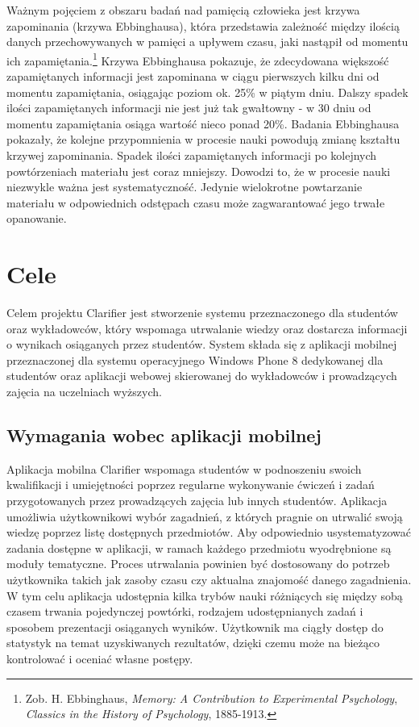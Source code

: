 \documentclass{pracamgr}
\begin{document}
Ważnym pojęciem z obszaru badań nad pamięcią człowieka jest krzywa zapominania (krzywa Ebbinghausa), która przedstawia zależność między ilością danych przechowywanych w pamięci a upływem czasu, jaki nastąpił od momentu ich zapamiętania.\footnote{Zob. H. Ebbinghaus, \textit{Memory: A Contribution to Experimental Psychology}, \textit{Classics in the History of Psychology}, 1885-1913.} Krzywa Ebbinghausa pokazuje, że zdecydowana większość zapamiętanych informacji jest zapominana w ciągu pierwszych kilku dni od momentu zapamiętania, osiągając poziom ok. 25\% w piątym dniu. Dalszy spadek ilości zapamiętanych informacji nie jest już tak gwałtowny - w 30 dniu od momentu zapamiętania osiąga wartość nieco ponad 20\%. Badania Ebbinghausa pokazały, że kolejne przypomnienia w procesie nauki powodują zmianę kształtu krzywej zapominania. Spadek ilości zapamiętanych informacji po kolejnych powtórzeniach materiału jest coraz mniejszy. Dowodzi to, że w procesie nauki niezwykle ważna jest systematyczność. Jedynie wielokrotne powtarzanie materiału w odpowiednich odstępach czasu może zagwarantować jego trwałe opanowanie. 

\section{Cele}

Celem projektu Clarifier jest stworzenie systemu przeznaczonego dla studentów oraz wykładowców, który wspomaga utrwalanie wiedzy oraz dostarcza informacji o wynikach osiąganych przez studentów. System składa się z aplikacji mobilnej przeznaczonej dla systemu operacyjnego Windows Phone 8 dedykowanej dla studentów oraz aplikacji webowej skierowanej do wykładowców i prowadzących zajęcia na uczelniach wyższych.

\subsection{Wymagania wobec aplikacji mobilnej}
Aplikacja mobilna Clarifier wspomaga studentów w podnoszeniu swoich kwalifikacji i umiejętności poprzez regularne wykonywanie ćwiczeń i zadań przygotowanych przez prowadzących zajęcia lub innych studentów. Aplikacja umożliwia użytkownikowi wybór zagadnień, z których pragnie on utrwalić swoją wiedzę poprzez listę dostępnych przedmiotów. Aby odpowiednio usystematyzować zadania dostępne w aplikacji, w ramach każdego przedmiotu wyodrębnione są moduły tematyczne. Proces utrwalania powinien być dostosowany do potrzeb użytkownika takich jak zasoby czasu czy aktualna znajomość danego zagadnienia. W tym celu aplikacja udostępnia kilka trybów nauki różniących się między sobą czasem trwania pojedynczej powtórki, rodzajem udostępnianych zadań i sposobem prezentacji osiąganych wyników. Użytkownik ma ciągły dostęp do statystyk na temat uzyskiwanych rezultatów, dzięki czemu może na bieżąco kontrolować i oceniać własne postępy. 
\end{document}
